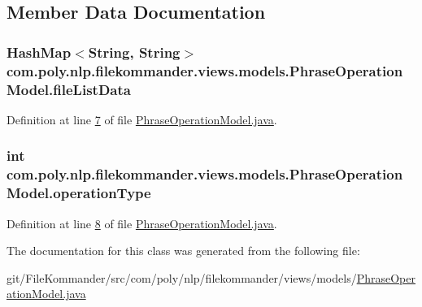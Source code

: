 \subsection{Member Data Documentation}
\hypertarget{classcom_1_1poly_1_1nlp_1_1filekommander_1_1views_1_1models_1_1_phrase_operation_model_afdc0b835818c55deb8ff7f22ec6b3d62}{
\subsubsection[{file\-List\-Data}]{\setlength{\rightskip}{0pt plus 5cm}Hash\-Map$<$String, String$>$ com.\-poly.\-nlp.\-filekommander.\-views.\-models.\-Phrase\-Operation\-Model.\-file\-List\-Data\hspace{0.3cm}{\ttfamily [private]}}}\label{classcom_1_1poly_1_1nlp_1_1filekommander_1_1views_1_1models_1_1_phrase_operation_model_afdc0b835818c55deb8ff7f22ec6b3d62}


Definition at line \hyperlink{L7}{7} of file \hyperlink{}{Phrase\-Operation\-Model.\-java}.

\hypertarget{classcom_1_1poly_1_1nlp_1_1filekommander_1_1views_1_1models_1_1_phrase_operation_model_a3cc9f099059b9e5e2f53e450e78650f1}{
\subsubsection[{operation\-Type}]{\setlength{\rightskip}{0pt plus 5cm}int com.\-poly.\-nlp.\-filekommander.\-views.\-models.\-Phrase\-Operation\-Model.\-operation\-Type\hspace{0.3cm}{\ttfamily [private]}}}\label{classcom_1_1poly_1_1nlp_1_1filekommander_1_1views_1_1models_1_1_phrase_operation_model_a3cc9f099059b9e5e2f53e450e78650f1}


Definition at line \hyperlink{L8}{8} of file \hyperlink{}{Phrase\-Operation\-Model.\-java}.



The documentation for this class was generated from the following file\-:\begin{DoxyCompactItemize}
\item 
git/\-File\-Kommander/src/com/poly/nlp/filekommander/views/models/\hyperlink{_phrase_operation_model_8java}{Phrase\-Operation\-Model.\-java}\end{DoxyCompactItemize}
